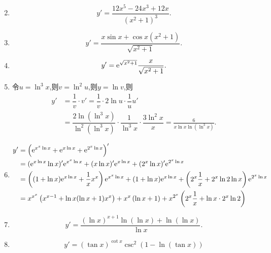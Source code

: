 \begin{solution}
\begin{enumerate}
\begin{align*}
              \end{align*}
        \item $$y' = \frac{12x^5 - 24 x^3 +12x}{(x^2+1)^3}.$$
        \item $$y' = \frac{x \sin x + \cos x (x^2+1)}{\sqrt{x^2+1}}.$$
        \item $$y' = \mathrm{e}^{\sqrt{x^2+1}} \frac{x}{\sqrt{x^2+1}}.$$
        \item 令$u = \ln^3 x$,则$v = \ln^2 u$,则$y = \ln v$,则
              \begin{align*}
                  y' & = \dfrac{1}{v} \cdot v' = \dfrac{1}{v} \cdot 2 \ln u \cdot \dfrac{1}{u} u'                                                       \\
                     & = \dfrac{2 \ln (\ln^3 x)}{\ln^2 (\ln^3 x)} \cdot \dfrac{1}{\ln^3 x} \cdot \dfrac{3 \ln^2 x}{x} = \frac{6}{x \ln x \ln(\ln^3 x)}.
              \end{align*}
        \item \begin{align*}
                  y' & =\left( \mathrm{e}^{x^x \ln x} + \mathrm{e}^{x \ln x} + \mathrm{e}^{2^x \ln x} \right)'                                                                                                \\
                     & = (\mathrm{e}^{x \ln x} \ln x)' \mathrm{e}^{x^x \ln x} + (x \ln x)' \mathrm{e}^{x \ln x} + (2^x \ln x)' \mathrm{e}^{2^x \ln x}                                                                 \\
                     & = \left((1 + \ln x)\mathrm{e}^{x \ln x} + \frac{1}{x}x^x \right) \mathrm{e}^{x^x \ln x} + (1+\ln x)\mathrm{e}^{x \ln x} + \left(2^x \frac{1}{x} + 2^x \ln 2 \ln x\right)\mathrm{e}^{2^x \ln x} \\
                     & =  x^{x^x} \left( x^{x-1} + \ln x (\ln x +1) x^x \right) + x^x \left( \ln x + 1 \right) + x^{2^x} \left( 2^x \dfrac{1}{x} + \ln x \cdot 2^x \ln 2 \right)
              \end{align*}
        \item $$y' = \frac{(\ln x)^{x+1} \ln (\ln x) + \ln (\ln x)}{\ln x}.$$
        \item $$y' = (\tan x)^{\cot x} \csc^2 (1 - \ln (\tan x))$$


\end{enumerate}
\end{solution}
